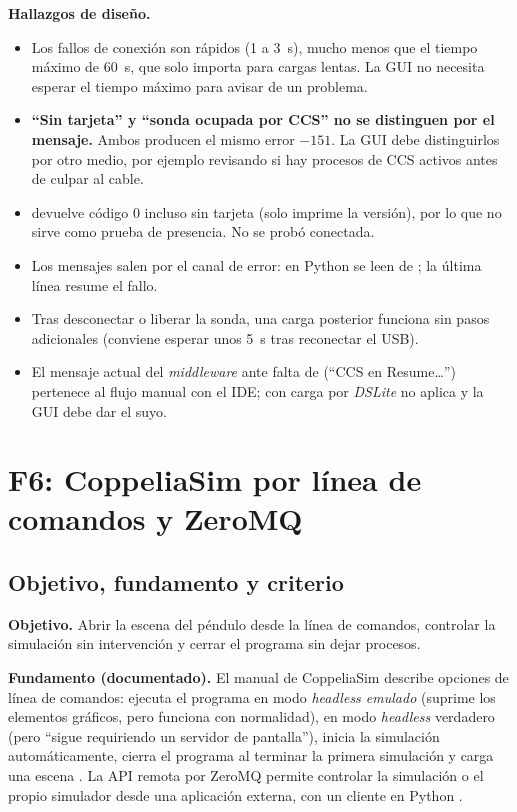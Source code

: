 \documentclass[12pt,letterpaper]{article}
\newcommand{\cod}[1]{\texttt{\detokenize{#1}}}
\begin{document}
\textbf{Hallazgos de diseño.}
\begin{itemize}
    \item Los fallos de conexión son rápidos (1 a 3~s), mucho menos que el tiempo máximo de 60~s, que solo importa para cargas lentas. La GUI no necesita esperar el tiempo máximo para avisar de un problema.
    \item \textbf{``Sin tarjeta'' y ``sonda ocupada por CCS'' no se distinguen por el mensaje.} Ambos producen el mismo error $-151$. La GUI debe distinguirlos por otro medio, por ejemplo revisando si hay procesos de CCS activos antes de culpar al cable.
    \item \cod{identifyProbe} devuelve código 0 incluso sin tarjeta (solo imprime la versión), por lo que no sirve como prueba de presencia. No se probó conectada.
    \item Los mensajes salen por el canal de error: en Python se leen de \cod{stderr}; la última línea \cod{Failed: ...} resume el fallo.
    \item Tras desconectar o liberar la sonda, una carga posterior funciona sin pasos adicionales (conviene esperar unos 5~s tras reconectar el USB).
    \item El mensaje actual del \textit{middleware} ante falta de \cod{OK} (``CCS en Resume\ldots'') pertenece al flujo manual con el IDE; con carga por \textit{DSLite} no aplica y la GUI debe dar el suyo.
\end{itemize}

\section{F6: CoppeliaSim por línea de comandos y ZeroMQ}
\label{sec:f6}

\subsection{Objetivo, fundamento y criterio}

\textbf{Objetivo.} Abrir la escena del péndulo desde la línea de comandos, controlar la simulación sin intervención y cerrar el programa sin dejar procesos.

\textbf{Fundamento (documentado).} El manual de CoppeliaSim describe opciones de línea de comandos: \cod{-h} ejecuta el programa en modo \textit{headless emulado} (suprime los elementos gráficos, pero funciona con normalidad), \cod{-H} en modo \textit{headless} verdadero (pero ``sigue requiriendo un servidor de pantalla''), \cod{-s} inicia la simulación automáticamente, \cod{-q} cierra el programa al terminar la primera simulación y \cod{-f} carga una escena \cite{coppelia_cmd}. La API remota por ZeroMQ permite controlar la simulación o el propio simulador desde una aplicación externa, con un cliente en Python \cite{coppelia_zmq}.
\end{document}
